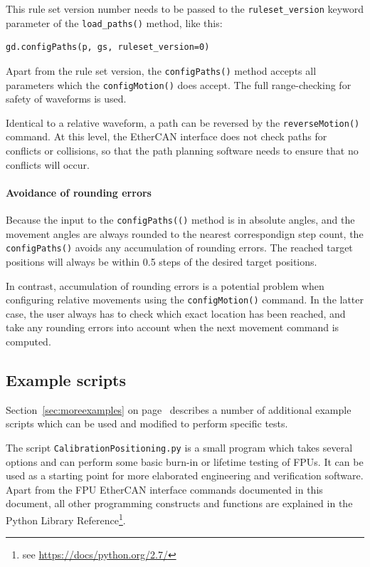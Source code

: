 \documentclass[11pt,a4paper]{scrartcl}
\begin{document}
%
%
This rule set version number needs to be passed to the
\texttt{ruleset\_version} keyword parameter of the
\texttt{load\_paths()} method, like this:


\begin{verbatim}
gd.configPaths(p, gs, ruleset_version=0)
\end{verbatim}

Apart from the rule set version, the \texttt{configPaths()} method
accepts all parameters which the \texttt{configMotion()} does accept.
The full range-checking for safety of waveforms is used.

Identical to a relative waveform, a path can be reversed by the
\texttt{reverseMotion()} command. At this level, the EtherCAN interface does not
check paths for conflicts or collisions, so that the path planning
software needs to ensure that no conflicts will occur.

\paragraph{Avoidance of rounding errors}
 Because the input to the
\texttt{configPaths(()} method is in absolute angles, and the movement
angles are always rounded to the nearest correspondign step count, the
\texttt{configPaths()} avoids any accumulation of rounding errors. The
reached target positions will always be within 0.5 steps of the
desired target positions.

In contrast, accumulation of rounding errors is a potential problem
when configuring relative movements using the \texttt{configMotion()}
command. In the latter case, the user always has to check which exact
location has been reached, and take any rounding errors into account
when the next movement command is computed.



\subsection{Example scripts}

Section~\ref{sec:moreexamples} on page~\pageref{sec:moreexamples}
describes a number of additional example scripts which can be used and
modified to perform specific tests.

The script \texttt{CalibrationPositioning.py} is a small program which
takes several options and can perform some basic burn-in or lifetime
testing of FPUs. It can be used as a starting point for more
elaborated engineering and verification software. Apart from the FPU
EtherCAN interface commands documented in this document, all other programming
constructs and functions are explained in the Python Library
Reference\footnote{see \url{https://docs/python.org/2.7/}}.
\end{document}
